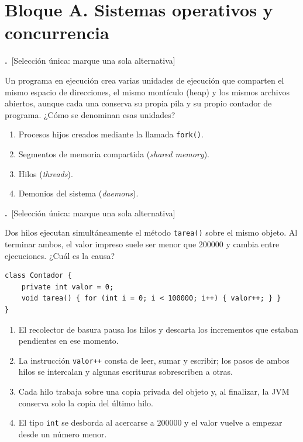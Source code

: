 \documentclass[11pt,a4paper]{article}
\newif\ifclave
\newcounter{preg}
\newcommand{\tipounica}{\textcolor{uteqMid}{\small\textsf{[Selección única: marque una sola alternativa]}}}
\newcommand{\pregunta}[2]{%
	\refstepcounter{preg}%
	\par\medskip
	\noindent\textbf{\color{uteqBlue}\arabic{preg}.}~#1\par
	\noindent #2\par\nopagebreak
}
\newcommand{\ok}{\ifclave~\textcolor{uteqGreen}{\ding{51}~\textbf{Correcta}}\fi}
\newenvironment{opciones}{%
	\begin{enumerate}[label={$\square$\ \alph*)},leftmargin=2.6em,itemsep=1pt,topsep=2pt]
}{%
	\end{enumerate}
}
\newcommand{\just}[1]{%
	\ifclave
		\begin{tcolorbox}[colback=uteqGreen!6,colframe=uteqGreen!70!black,boxrule=0.4pt,arc=1mm,left=4pt,right=4pt,top=2pt,bottom=2pt,fontupper=\small]
			\textbf{Justificación:} #1
		\end{tcolorbox}
	\fi
}
\begin{document}
\section*{\color{uteqBlue}\large Bloque A. Sistemas operativos y concurrencia}

\pregunta{\tipounica}{Un programa en ejecución crea varias unidades de ejecución que comparten el mismo espacio de direcciones, el mismo montículo (heap) y los mismos archivos abiertos, aunque cada una conserva su propia pila y su propio contador de programa. ¿Cómo se denominan esas unidades?}
\begin{opciones}
	\item Procesos hijos creados mediante la llamada \texttt{fork()}.
	\item Segmentos de memoria compartida (\emph{shared memory}).
	\item Hilos (\emph{threads}).\ok
	\item Demonios del sistema (\emph{daemons}).
\end{opciones}
\just{Los hilos de un mismo proceso comparten código, datos, montículo y descriptores, pero cada uno tiene pila, registros y contador de programa propios. Un proceso creado con \texttt{fork()} recibe una copia separada del espacio de direcciones; un segmento de memoria compartida es una región, no una unidad de ejecución; un demonio es un proceso en segundo plano.}

\pregunta{\tipounica}{Dos hilos ejecutan simultáneamente el método \texttt{tarea()} sobre el mismo objeto. Al terminar ambos, el valor impreso suele ser menor que 200000 y cambia entre ejecuciones. ¿Cuál es la causa?}
\begin{lstlisting}
class Contador {
    private int valor = 0;
    void tarea() { for (int i = 0; i < 100000; i++) { valor++; } }
}
\end{lstlisting}
\begin{opciones}
	\item El recolector de basura pausa los hilos y descarta los incrementos que estaban pendientes en ese momento.
	\item La instrucción \texttt{valor++} consta de leer, sumar y escribir; los pasos de ambos hilos se intercalan y algunas escrituras sobrescriben a otras.\ok
	\item Cada hilo trabaja sobre una copia privada del objeto y, al finalizar, la JVM conserva solo la copia del último hilo.
	\item El tipo \texttt{int} se desborda al acercarse a 200000 y el valor vuelve a empezar desde un número menor.
\end{opciones}
\just{Es una condición de carrera: \texttt{valor++} no es atómica, por lo que dos hilos pueden leer el mismo valor y escribir el mismo resultado, perdiendo una actualización \cite{goetz2006jcip}. El recolector no altera variables vivas, la JVM no duplica objetos por hilo y el máximo de \texttt{int} supera los dos mil millones.}
\end{document}
